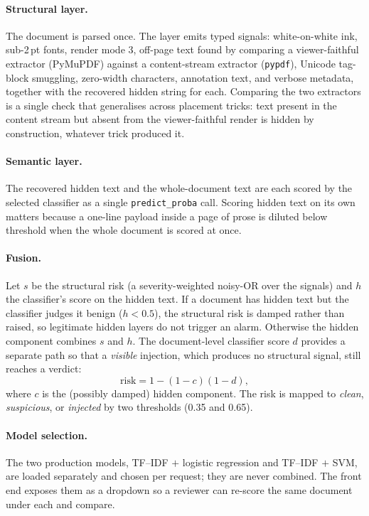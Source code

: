 \documentclass[11pt]{article}
\begin{document}
\paragraph{Structural layer.} The document is parsed once. The layer emits
typed signals: white-on-white ink, sub-2\,pt fonts, render mode 3, off-page
text found by comparing a viewer-faithful extractor (PyMuPDF) against a
content-stream extractor (\texttt{pypdf}), Unicode tag-block smuggling,
zero-width characters, annotation text, and verbose metadata, together with the
recovered hidden string for each. Comparing the two extractors is a single
check that generalises across placement tricks: text present in the content
stream but absent from the viewer-faithful render is hidden by construction,
whatever trick produced it.

\paragraph{Semantic layer.} The recovered hidden text and the whole-document
text are each scored by the selected classifier as a single
\texttt{predict\_proba} call. Scoring hidden text on its own matters because a
one-line payload inside a page of prose is diluted below threshold when the
whole document is scored at once.

\paragraph{Fusion.} Let $s$ be the structural risk (a severity-weighted
noisy-OR over the signals) and $h$ the classifier's score on the hidden text.
If a document has hidden text but the classifier judges it benign
($h < 0.5$), the structural risk is damped rather than raised, so legitimate
hidden layers do not trigger an alarm. Otherwise the hidden component combines
$s$ and $h$. The document-level classifier score $d$ provides a separate path
so that a \emph{visible} injection, which produces no structural signal, still
reaches a verdict:
\begin{equation}
  \mathrm{risk} = 1 - (1 - c)(1 - d),
  \label{eq:fuse}
\end{equation}
where $c$ is the (possibly damped) hidden component. The risk is mapped to
\emph{clean}, \emph{suspicious}, or \emph{injected} by two thresholds
(0.35 and 0.65).

\paragraph{Model selection.} The two production models, TF--IDF $+$ logistic
regression and TF--IDF $+$ SVM, are loaded separately and chosen per request;
they are never combined. The front end exposes them as a dropdown so a reviewer
can re-score the same document under each and compare.
\end{document}

